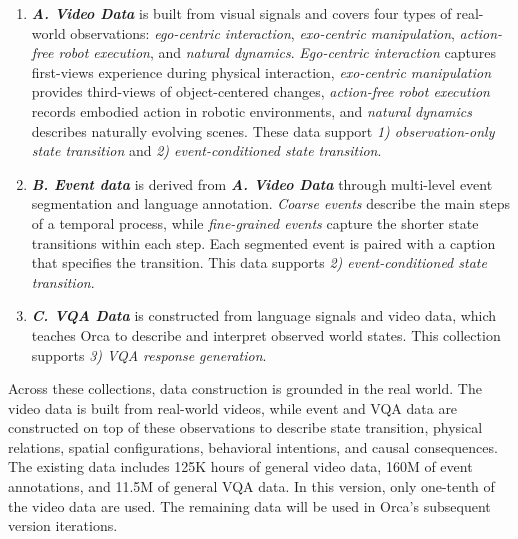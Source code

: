 \vspace{-1ex}
\begin{enumerate}[
    leftmargin=1.35em,
    itemsep=0.35em,
    topsep=0.35em,
    parsep=0em
]
    \item[] 
    \textit{\textbf{A. Video Data}} is built from visual signals and covers four types of real-world observations: \textit{{ego-centric interaction}}, \textit{{exo-centric manipulation}}, {\textit{action-free robot execution}}, and {\textit{natural dynamics}}. {\textit{Ego-centric interaction}} captures first-views experience during physical interaction, {\textit{exo-centric manipulation}} provides third-views of object-centered changes, {\textit{action-free robot execution}} records embodied action in robotic environments, and {\textit{natural dynamics}} describes naturally evolving scenes. These data support \textit{1) observation-only state transition} and \textit{2) event-conditioned state transition}.

    \item[] 
    \textit{\textbf{B. Event data}} is derived from \textit{\textbf{A. Video Data}} through multi-level event segmentation and language annotation. {\textit{Coarse events}} describe the main steps of a temporal process, while {\textit{fine-grained events}} capture the shorter state transitions within each step. Each segmented event is paired with a caption that specifies the transition. This data supports \textit{2) event-conditioned state transition}.

    \item[]
    \textit{\textbf{C. VQA Data}} is constructed from language signals and video data, which teaches Orca to describe and interpret observed world states. This collection supports \textit{3) VQA response generation}.
\end{enumerate}
\vspace{-1ex}

Across these collections, data construction is grounded in the real world. The video data is built from real-world videos, while event and VQA data are constructed on top of these observations to describe state transition, physical relations, spatial configurations, behavioral intentions, and causal consequences. The existing data includes 125K hours of general video data, 160M of event annotations, and 11.5M of general VQA data. In this version, only one-tenth of the video data are used. The remaining data will be used in Orca's subsequent version iterations.


